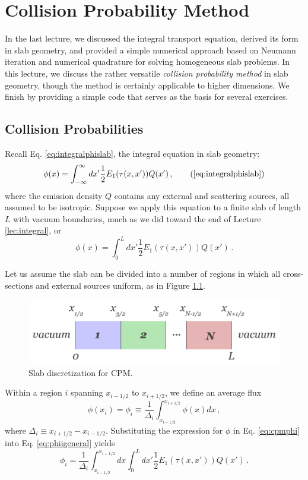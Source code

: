 \chapter{Collision Probability Method}
\label{lec:cpm}

In the last lecture, we discussed the integral transport equation, derived its form in slab geometry, and provided a simple numerical approach based on Neumann iteration and numerical quadrature for solving homogeneous slab problems.  In this lecture, we discuss the rather versatile \textit{collision probability method} in slab geometry, though the method is certainly applicable to higher dimensions.  We finish by providing a simple code that serves as the basis for several exercises.

\section*{Collision Probabilities}

Recall Eq. \ref{eq:integralphislab}, the integral equation in slab geometry:
\begin{equation}
 \phi(x) =  \int^{\infty}_{-\infty} dx'\frac{1}{2} E_1(\tau(x,x'))Q(x') \, ,   
 \tag{\ref{eq:integralphislab}}     
\end{equation}
where the emission density $Q$ contains any external and scattering sources, all assumed to be isotropic.  Suppose we apply this equation to a finite slab of length $L$ with vacuum boundaries, much as we did toward the end of Lecture \ref{lec:integral}, or
\begin{equation}
 \phi(x) = \int^L_0  dx' \frac{1}{2} E_1(\tau(x,x')) Q(x') \, .
 \label{eq:cpmphi}
\end{equation}


Let us assume the slab can be divided into a number of regions in which all cross-sections and external sources uniform, as in Figure \ref{fig:slab_spatial}.  
\begin{figure}[t] 
    \centering
    \includegraphics[keepaspectratio, width = 4.0 in]{images/cpmslab}
    \caption{Slab discretization for CPM.}
    \label{fig:slab_spatial}
\end{figure}
Within a region $i$ spanning $x_{i-1/2}$ to $x_{i+1/2}$, we define an average flux
\begin{equation}
 \phi(x_i) = \phi_i \equiv \frac{1}{\Delta_i} \int^{x_{i+1/2}}_{x_{i-1/2}} \phi(x) dx \, ,
 \label{eq:phiigeneral}
\end{equation}
where $\Delta_i \equiv x_{i+1/2}-x_{i-1/2}$.  Substituting the expression for $\phi$ in Eq. \ref{eq:cpmphi} into Eq. \ref{eq:phiigeneral} yields
\begin{equation}
 \phi_i = \frac{1}{\Delta_i} \int^{x_{i+1/2}}_{x_{i-1/2}} dx \int^L_0  dx' \frac{1}{2} E_1(\tau(x,x')) Q(x') \, .
 \label{eq:phii}
\end{equation}


